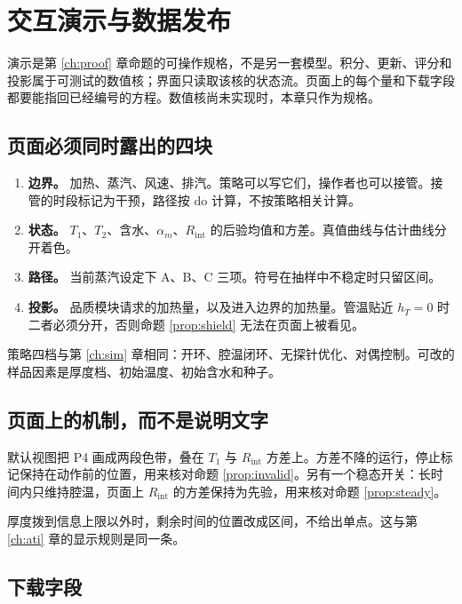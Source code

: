 \chapter{交互演示与数据发布}
\label{ch:demo}

演示是第 \ref{ch:proof} 章命题的可操作规格，不是另一套模型。积分、更新、评分和投影属于可测试的数值核；界面只读取该核的状态流。页面上的每个量和下载字段都要能指回已经编号的方程。数值核尚未实现时，本章只作为规格。

\section{页面必须同时露出的四块}

\begin{enumerate}
\item \textbf{边界。} 加热、蒸汽、风速、排汽。策略可以写它们，操作者也可以接管。接管的时段标记为干预，路径按 $\mathrm{do}$ 计算，不按策略相关计算。
\item \textbf{状态。} $T_1$、$T_2$、含水、$\alpha_m$、$R_{\mathrm{int}}$ 的后验均值和方差。真值曲线与估计曲线分开着色。
\item \textbf{路径。} 当前蒸汽设定下 A、B、C 三项。符号在抽样中不稳定时只留区间。
\item \textbf{投影。} 品质模块请求的加热量，以及进入边界的加热量。管温贴近 $h_T=0$ 时二者必须分开，否则命题 \ref{prop:shield} 无法在页面上被看见。
\end{enumerate}

策略四档与第 \ref{ch:sim} 章相同：开环、腔温闭环、无探针优化、对偶控制。可改的样品因素是厚度档、初始温度、初始含水和种子。

\section{页面上的机制，而不是说明文字}

默认视图把 P4 画成两段色带，叠在 $T_1$ 与 $R_{\mathrm{int}}$ 方差上。方差不降的运行，停止标记保持在动作前的位置，用来核对命题 \ref{prop:invalid}。另有一个稳态开关：长时间内只维持腔温，页面上 $R_{\mathrm{int}}$ 的方差保持为先验，用来核对命题 \ref{prop:steady}。

厚度拨到信息上限以外时，剩余时间的位置改成区间，不给出单点。这与第 \ref{ch:ati} 章的显示规则是同一条。

\section{下载字段}

